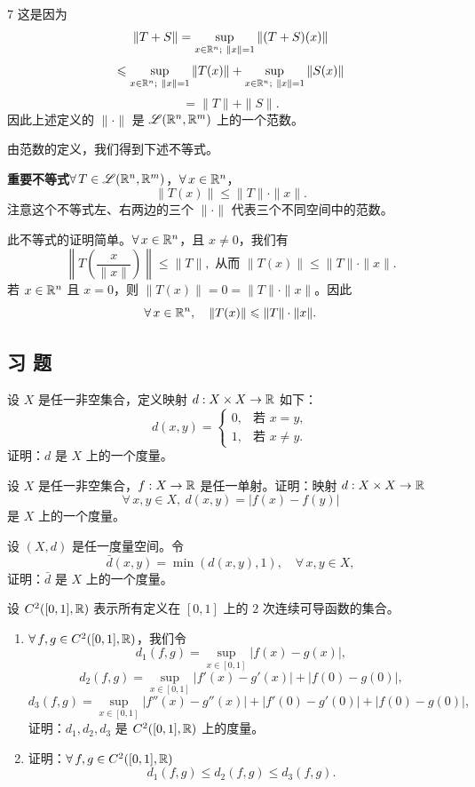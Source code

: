 \begin{sourceexample}{7}
这是因为
\[\|T+S\|=\sup_{x\in\R^n;\ \|x\|=1}\|(T+S)(x)\|\]
\[\leqslant\sup_{x\in\R^n;\ \|x\|=1}\|T(x)\|+\sup_{x\in\R^n;\ \|x\|=1}\|S(x)\|\]
\[=\|T\|+\|S\|.\]
因此上述定义的 $\|\cdot\|$ 是 $\mathscr{L}(\mathbb{R}^n,\mathbb{R}^m)$ 上的一个范数。

由范数的定义，我们得到下述不等式。

\textbf{重要不等式}\quad $\forall\,T\in\mathscr{L}(\mathbb{R}^n,\mathbb{R}^m)$，$\forall\,x\in\mathbb{R}^n$，
\[\|T(x)\|\leqslant\|T\|\cdot\|x\|.\]
注意这个不等式左、右两边的三个 $\|\cdot\|$ 代表三个不同空间中的范数。

此不等式的证明简单。$\forall\,x\in\mathbb{R}^n$，且 $x\neq0$，我们有
\[\left\|T\left(\frac{x}{\|x\|}\right)\right\|\leqslant\|T\|,\text{ 从而 }\|T(x)\|\leqslant\|T\|\cdot\|x\|.\]
若 $x\in\mathbb{R}^n$ 且 $x=0$，则 $\|T(x)\|=0=\|T\|\cdot\|x\|$。因此
\[\forall\,x\in\mathbb{R}^n,\quad\|T(x)\|\leqslant\|T\|\cdot\|x\|.\]

\end{sourceexample}

\subsection*{习 题}

\begin{exercise}
	\item 设 $X$ 是任一非空集合，定义映射 $d:X\times X\to\mathbb{R}$ 如下：
	\[d(x,y)=\begin{cases} 0, & \text{若 }x=y,\\ 1, & \text{若 }x\neq y. \end{cases}\]
	证明：$d$ 是 $X$ 上的一个度量。
\end{exercise}

\begin{exercise}
	\item 设 $X$ 是任一非空集合，$f:X\to\mathbb{R}$ 是任一单射。证明：映射 $d:X\times X\to\mathbb{R}$
	\[\forall\,x,y\in X,\ d(x,y)=|f(x)-f(y)|\]
	是 $X$ 上的一个度量。
\end{exercise}

\begin{exercise}
	\item 设 $(X,d)$ 是任一度量空间。令
	\[\bar d(x,y)=\min(d(x,y),1),\quad\forall\,x,y\in X,\]
	证明：$\bar d$ 是 $X$ 上的一个度量。
\end{exercise}

\begin{exercise}
	\item 设 $C^2([0,1],\mathbb{R})$ 表示所有定义在 $[0,1]$ 上的 $2$ 次连续可导函数的集合。
	\begin{enumerate}[label=\arabic*)]
		\item $\forall\,f,g\in C^2([0,1],\mathbb{R})$，我们令
		\[d_1(f,g)=\sup_{x\in[0,1]}|f(x)-g(x)|,\]
		\[d_2(f,g)=\sup_{x\in[0,1]}|f'(x)-g'(x)|+|f(0)-g(0)|,\]
		\[d_3(f,g)=\sup_{x\in[0,1]}|f''(x)-g''(x)|+|f'(0)-g'(0)|+|f(0)-g(0)|,\]
		证明：$d_1,d_2,d_3$ 是 $C^2([0,1],\mathbb{R})$ 上的度量。
		\item 证明：$\forall\,f,g\in C^2([0,1],\mathbb{R})$
		\[d_1(f,g)\leqslant d_2(f,g)\leqslant d_3(f,g).\]
	\end{enumerate}
\end{exercise}

